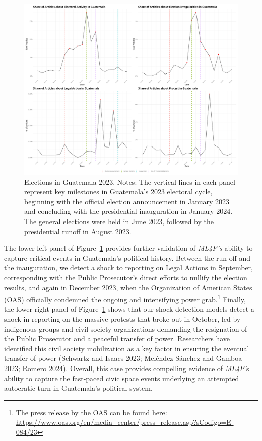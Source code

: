 \documentclass[
  letterpaper,
  DIV=11,
  numbers=noendperiod]{scrartcl}
\begin{document}
\begin{figure}

{\centering \includegraphics{event_validation/Combined_GTM2023_Plots.png}

}

\caption{\label{fig-gt_2023}Elections in Guatemala 2023. Notes: The
vertical lines in each panel represent key milestones in Guatemala's
2023 electoral cycle, beginning with the official election announcement
in January 2023 and concluding with the presidential inauguration in
January 2024. The general elections were held in June 2023, followed by
the presidential runoff in August 2023.}

\end{figure}

The lower-left panel of Figure~\ref{fig-gt_2023} provides further
validation of \emph{ML4P's} ability to capture critical events in
Guatemala's political history. Between the run-off and the inauguration,
we detect a shock to reporting on Legal Actions in September,
corresponding with the Public Prosecutor's direct efforts to nullify the
election results, and again in December 2023, when the Organization of
American States (OAS) officially condemned the ongoing and intensifying
power grab.\footnote{The press release by the OAS can be found here:
  \url{https://www.oas.org/en/media_center/press_release.asp?sCodigo=E-084/23}}
Finally, the lower-right panel of Figure~\ref{fig-gt_2023} shows that
our shock detection models detect a shock in reporting on the massive
protests that broke-out in October, led by indigenous groups and civil
society organizations demanding the resignation of the Public Prosecutor
and a peaceful transfer of power. Researchers have identified this civil
society mobilization as a key factor in ensuring the eventual transfer
of power (Schwartz and Isaacs 2023; Meléndez-Sánchez and Gamboa 2023;
Romero 2024). Overall, this case provides compelling evidence of
\emph{ML4P'}s ability to capture the fast-paced civic space events
underlying an attempted autocratic turn in Guatemala's political system.
\end{document}
